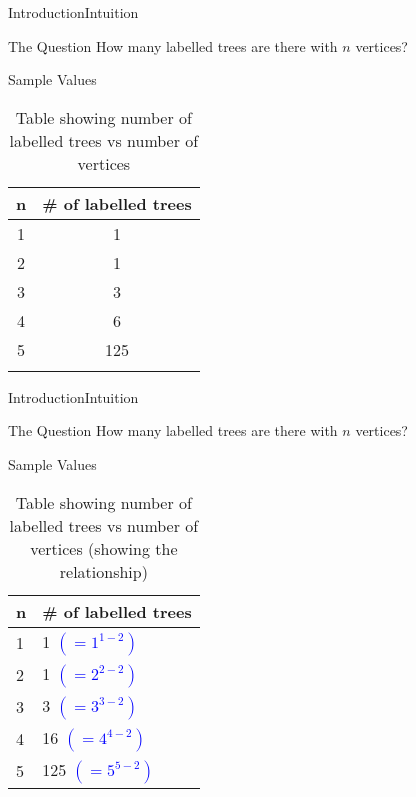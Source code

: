\documentclass[10pt]{beamer}
\theoremstyle{definition}
\newcommand{\Sone}{Introduction}
\newcommand{\SoneSSintuition}{Intuition}
\begin{document}
\begin{frame}{\Sone}{\SoneSSintuition}
\begin{block}{The Question}
How many labelled trees are there with $n$ vertices?
\end{block}

\pause{}

\begin{block}{Sample Values}
\begin{table}[ht]
\centering
\begin{tabular}[t]{cc}
\toprule
n&\# of labelled trees\\
\midrule
1&1   \\
2&1   \\
3&3   \\
4&6   \\
5&125 \\
\bottomrule
\label{tab:values}
\end{tabular}
\caption{Table showing number of labelled trees vs number of vertices}
\end{table}
\end{block}
  
\end{frame}

\begin{frame}{\Sone}{\SoneSSintuition}
\begin{block}{The Question}
How many labelled trees are there with $n$ vertices?
\end{block}

\begin{block}{Sample Values}
\begin{table}[]
\centering
\begin{tabular}{l|l}
n & \# of labelled trees                   \\ \hline
1 & 1   \textcolor{blue}{$(= 1^{1-2})$}    \\
2 & 1   \textcolor{blue}{$(= 2^{2-2})$}    \\
3 & 3   \textcolor{blue}{$(= 3^{3-2})$}    \\
4 & 16  \textcolor{blue}{$(= 4^{4-2})$}    \\
5 & 125 \textcolor{blue}{$(= 5^{5-2})$}    \\
\end{tabular}
\caption{Table showing number of labelled trees vs number of vertices (showing the relationship)}
\label{tab:values-relationship}
\end{table}
\end{block}
  
\end{frame}
\end{document}
